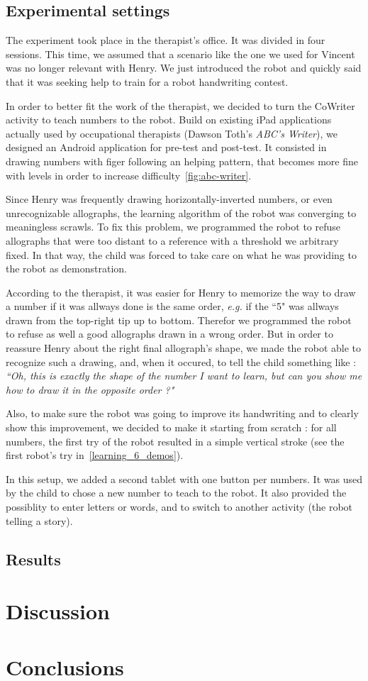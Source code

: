 \documentclass{sig-alternate}
\begin{document}
\subsection{Experimental settings}
The experiment took place in the therapist's office. It was divided in four
sessions. This time, we assumed that a scenario like the one we used for Vincent was
no longer relevant with Henry. We just introduced the robot and quickly
said that it was seeking help to train for a robot handwriting contest.

In order to better fit the work of the therapist, we decided to turn the 
CoWriter activity to teach numbers to the robot. Build on
existing iPad applications actually used by occupational therapists (Dawson Toth's \emph{ABC's
Writer}), we designed an Android application for pre-test and post-test. It consisted in drawing
numbers with figer following an helping pattern, that becomes more fine with
levels in order to increase difficulty~\ref{fig:abc-writer}.

Since Henry was frequently drawing horizontally-inverted numbers, or even
unrecognizable allographs, the learning algorithm of the robot was converging to
meaningless scrawls. To fix this problem, we programmed the robot to refuse allographs that
were too distant to a reference with a threshold we arbitrary fixed. In that way,
the child was forced to take care on what he was providing to the robot as
demonstration. 

According to the therapist, it was easier for Henry to memorize the way to draw
a number if it was allways done is the same order, \emph{e.g.} if the ``5" was allways
drawn from the top-right tip up to bottom. Therefor we programmed the robot to
refuse as well a good allographs drawn in a wrong order. But in order to reassure Henry
about the right final allograph's shape, we made the robot able to recognize
such a drawing, and, when it occured, to tell the child something like :
\emph{``Oh, this is exactly the shape of the number I want to learn, but can you
show me how to draw it in the opposite order ?"}

Also, to make sure the robot was going to improve its handwriting
and to clearly show this improvement, we decided to make it starting
from scratch : for all numbers, the first try of the robot resulted in
a simple vertical stroke (see the first robot's try
in~\ref{learning_6_demos}).

In this setup, we added a second tablet with one button per numbers. It was used
by the child to chose a new number to teach to the robot. It also provided the
possiblity to enter letters or words, and to switch to another activity (the
robot telling a story).


\subsection{Results}

\section{Discussion}

\section{Conclusions}


 
\end{document}
